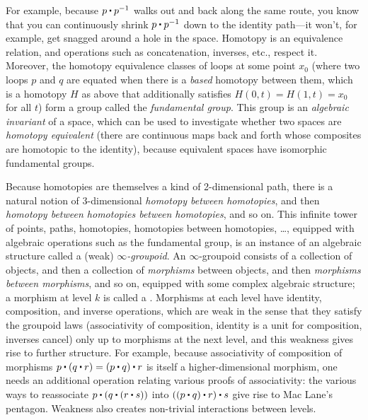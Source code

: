 For example, because
$p \ct \opp p$ walks out and back along the same route, you know that
you can continuously shrink $p \ct \opp p$ down to the identity
path---it won't, for example, get snagged around a hole in the space.
Homotopy is an equivalence relation, and operations such as
concatenation, inverses, etc., respect it.  Moreover, the homotopy
equivalence classes of loops at some point $x_0$ (where two loops $p$
and $q$ are equated when there is a \emph{based} homotopy between them,
which is a homotopy $H$ as above that additionally satisfies $H(0,t) =
H(1,t) = x_0$ for all $t$) form a group called the \emph{fundamental
  group}.  This group is an \emph{algebraic invariant} of a space, which
can be used to investigate whether two spaces are \emph{homotopy
  equivalent} (there are continuous maps back and forth whose composites
are homotopic to the identity), because equivalent spaces have
isomorphic fundamental groups.

Because homotopies are themselves a kind of 2-dimensional path, there is
a natural notion of 3-dimensional \emph{homotopy between homotopies},
and then \emph{homotopy between homotopies between homotopies}, and so
on.  This infinite tower of points, paths, homotopies, homotopies between
homotopies, \ldots, equipped with algebraic operations such as the
fundamental group, is an instance of an algebraic structure called a
(weak) \emph{$\infty$-groupoid}.  An $\infty$-groupoid consists of a
collection of objects, and then a collection of \emph{morphisms} between
objects, and then \emph{morphisms between morphisms}, and so on,
equipped with some complex algebraic structure; a morphism at level $k$ is called a .  Morphisms at each level
have identity, composition, and inverse operations, which are weak in
the sense that they satisfy the groupoid laws (associativity of
composition, identity is a unit for composition, inverses cancel) only
up to morphisms at the next level, and this weakness gives rise to
further structure. For example, because associativity of composition of
morphisms $p \ct (q \ct r) = (p \ct q) \ct r$ is itself a
higher-dimensional morphism, one needs an additional operation relating
various proofs of associativity: the various ways to reassociate $p \ct
(q \ct (r \ct s))$ into $((p \ct q) \ct r) \ct s$ give rise to Mac
Lane's pentagon.  Weakness also creates non-trivial interactions between
levels.

